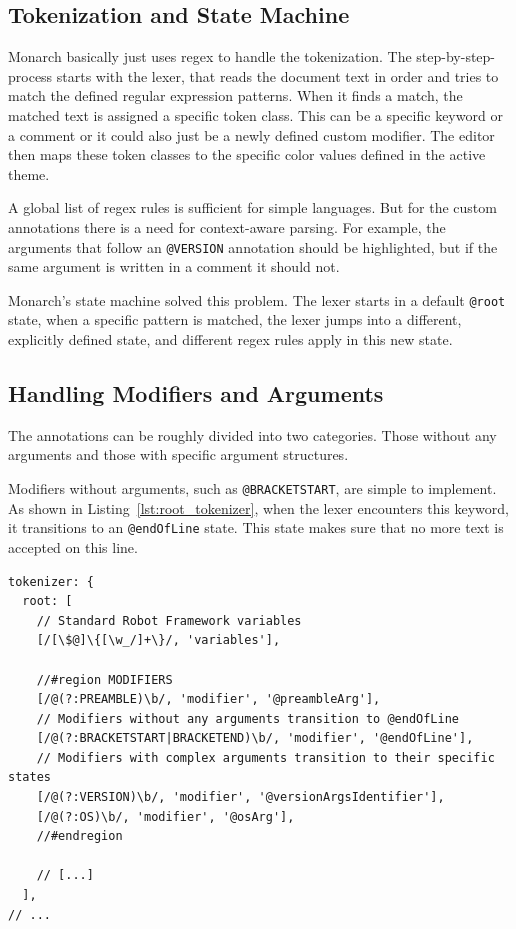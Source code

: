 \subsection{Tokenization and State Machine}

Monarch basically just uses \gls{regex} to handle the tokenization. The step-by-step-process starts with the lexer, that reads the document text in order and tries  to match the defined regular expression patterns. When it finds a match, the matched text is assigned a specific token class. This can be a specific keyword or a comment or it could also just be a newly defined custom modifier. The editor then maps these token classes to the specific color values defined in the active theme.

A global list of \gls{regex} rules is sufficient for simple languages. But for the custom annotations there is a need for context-aware parsing. For example, the arguments that follow an \texttt{@VERSION} annotation should be highlighted, but if the same argument is written in a comment it should not.

Monarch's state machine solved this problem. The lexer starts in a default \texttt{@root} state, when a specific pattern is matched, the lexer jumps into a different, explicitly defined state, and different \gls{regex} rules apply in this new state.

\subsection{Handling Modifiers and Arguments}

The annotations can be roughly divided into two categories. Those without any arguments and those with specific argument structures.

Modifiers without arguments, such as \texttt{@BRACKETSTART}, are simple to implement. As shown in Listing~\ref{lst:root_tokenizer}, when the lexer encounters this keyword, it transitions to an \texttt{@endOfLine} state. This state  makes sure that no more text is accepted on this line. 

\begin{lstlisting}[caption={Monarch tokenizers root state}, label={lst:root_tokenizer}, float=htbp]
tokenizer: {
  root: [
    // Standard Robot Framework variables
    [/[\$@]\{[\w_/]+\}/, 'variables'],

    //#region MODIFIERS
    [/@(?:PREAMBLE)\b/, 'modifier', '@preambleArg'],
    // Modifiers without any arguments transition to @endOfLine
    [/@(?:BRACKETSTART|BRACKETEND)\b/, 'modifier', '@endOfLine'], 
    // Modifiers with complex arguments transition to their specific states
    [/@(?:VERSION)\b/, 'modifier', '@versionArgsIdentifier'],
    [/@(?:OS)\b/, 'modifier', '@osArg'],
    //#endregion
    
    // [...]
  ],
// ...
\end{lstlisting}

